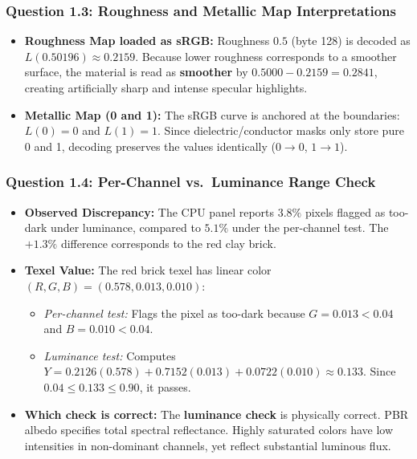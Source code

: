 \documentclass[10pt,a4paper]{article}
\begin{document}
\subsubsection*{Question 1.3: Roughness and Metallic Map Interpretations}
\begin{itemize}
    \item \textbf{Roughness Map loaded as sRGB:} Roughness $0.5$ (byte 128) is decoded as $L(0.50196) \approx 0.2159$. Because lower roughness corresponds to a smoother surface, the material is read as \textbf{smoother} by $0.5000 - 0.2159 = \mathbf{0.2841}$, creating artificially sharp and intense specular highlights.
    \item \textbf{Metallic Map (0 and 1):} The sRGB curve is anchored at the boundaries: $L(0) = 0$ and $L(1) = 1$. Since dielectric/conductor masks only store pure 0 and 1, decoding preserves the values identically ($0 \to 0$, $1 \to 1$).
\end{itemize}

\subsubsection*{Question 1.4: Per-Channel vs.\ Luminance Range Check}
\begin{itemize}
    \item \textbf{Observed Discrepancy:} The CPU panel reports $3.8\%$ pixels flagged as too-dark under luminance, compared to $5.1\%$ under the per-channel test. The $+1.3\%$ difference corresponds to the red clay brick.
    \item \textbf{Texel Value:} The red brick texel has linear color $(R, G, B) = (0.578, 0.013, 0.010)$:
    \begin{itemize}
        \item \emph{Per-channel test:} Flags the pixel as too-dark because $G = 0.013 < 0.04$ and $B = 0.010 < 0.04$.
        \item \emph{Luminance test:} Computes $Y = 0.2126(0.578) + 0.7152(0.013) + 0.0722(0.010) \approx 0.133$. Since $0.04 \le 0.133 \le 0.90$, it passes.
    \end{itemize}
    \item \textbf{Which check is correct:} The \textbf{luminance check} is physically correct. PBR albedo specifies total spectral reflectance. Highly saturated colors have low intensities in non-dominant channels, yet reflect substantial luminous flux.
\end{itemize}
\end{document}
